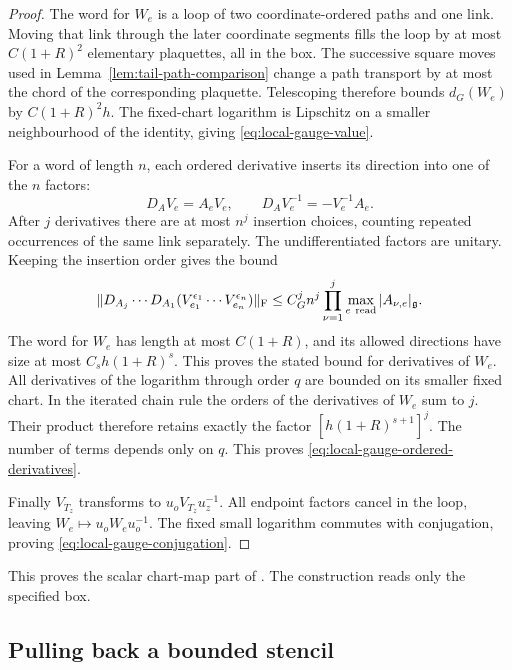 \documentclass[11pt,reqno]{amsart}
\numberwithin{equation}{section}
\theoremstyle{definition}
\theoremstyle{remark}
\newcommand{\g}{\mathfrak g}
\begin{document}
\begin{proof}
The word for \(W_e\) is a loop of two
coordinate-ordered paths and one link.
Moving that link through the later coordinate
segments fills the loop by at most \(C(1+R)^2\)
elementary plaquettes, all in the box.
The successive square moves used in
Lemma~\ref{lem:tail-path-comparison} change a
path transport by at most the chord of the
corresponding plaquette.
Telescoping therefore bounds \(d_G(W_e)\) by
\(C(1+R)^2h\).
The fixed-chart logarithm is Lipschitz on a
smaller neighbourhood of the identity, giving
\eqref{eq:local-gauge-value}.

For a word of length \(n\), each ordered
derivative inserts its direction into one
of the \(n\) factors:
\[
                  D_AV_e=A_eV_e,\qquad
                  D_AV_e^{-1}=-V_e^{-1}A_e .
\]
After \(j\) derivatives there are at most \(n^j\)
insertion choices, counting repeated occurrences
of the same link separately.
The undifferentiated factors are unitary.
Keeping the insertion order gives the bound
\begin{equation}
 \|D_{A_j}\cdots D_{A_1}
           (V_{e_1}^{\epsilon_1}\cdots V_{e_n}^{\epsilon_n})\|_{\rm F}
   \le C_G^j n^j
                    \prod_{\nu=1}^j
                          \max_{e\ {\rm read}}|A_{\nu,e}|_{\g}.
 \label{eq:local-ordered-word-price}
\end{equation}
The word for \(W_e\) has length at most
\(C(1+R)\), and its allowed directions have
size at most \(C_s h(1+R)^s\).
This proves the stated bound for derivatives
of \(W_e\).
All derivatives of the logarithm through order
\(q\) are bounded on its smaller fixed chart.
In the iterated chain rule the orders of the
derivatives of \(W_e\) sum to \(j\).
Their product therefore retains exactly the
factor \([h(1+R)^{s+1}]^j\).
The number of terms depends only on \(q\).
This proves
\eqref{eq:local-gauge-ordered-derivatives}.

Finally \(V_{T_z}\) transforms to
\(u_oV_{T_z}u_z^{-1}\).
All endpoint factors cancel in the loop, leaving
\(W_e\mapsto u_oW_eu_o^{-1}\).
The fixed small logarithm commutes with
conjugation, proving
\eqref{eq:local-gauge-conjugation}.
\end{proof}

This proves the scalar chart-map part of
\cite[Lemma~16.9, pp.~86--87]{Main}.
The construction reads only the specified box.

\subsection{Pulling back a bounded stencil}
\end{document}
